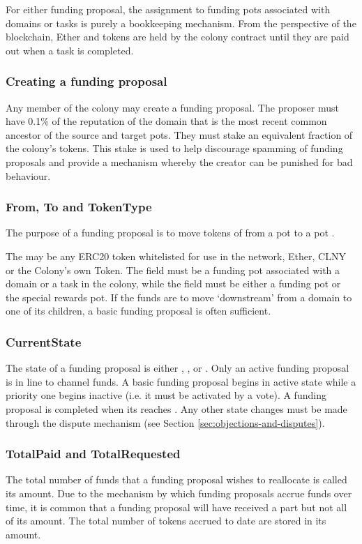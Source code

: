 For either funding proposal, the assignment to funding pots associated with domains or tasks is purely a bookkeeping mechanism. From the perspective of the blockchain, Ether and tokens are held by the colony contract until they are paid out when a task is completed.

\subsubsection{Creating a funding proposal}
Any member of the colony may create a funding proposal. The proposer must have 0.1\% of the reputation of the domain that is the most recent common ancestor of the source and target pots. They must stake an equivalent fraction of the colony's tokens. This stake is used to help discourage spamming of funding proposals and provide a mechanism whereby the creator can be punished for bad behaviour.

\subsubsection{From, To and TokenType}
The purpose of a funding proposal is to move tokens of  from a pot  to a pot .

The  may be any ERC20 token whitelisted for use in the network, Ether, CLNY or the Colony's own Token. The  field must be a funding pot associated with a domain or a task in the colony, while the  field must be either a funding pot or the special rewards pot. If the funds are to move `downstream' from a domain to one of its children, a basic funding proposal is often sufficient.

\subsubsection{CurrentState}
The state of a funding proposal is either , ,  or . Only an active funding proposal is in line to channel funds. A basic funding proposal begins in active state while a priority one begins inactive (i.e. it must be activated by a vote). A funding proposal is completed when its  reaches . Any other state changes must be made through the dispute mechanism (see Section \ref{sec:objections-and-disputes}).

\subsubsection{TotalPaid and TotalRequested}
The total number of funds that a funding proposal wishes to reallocate is called its  amount. Due to the mechanism by which funding proposals accrue funds over time, it is common that a funding proposal will have received a part but not all of its  amount. The total number of tokens accrued to date are stored in its  amount.

